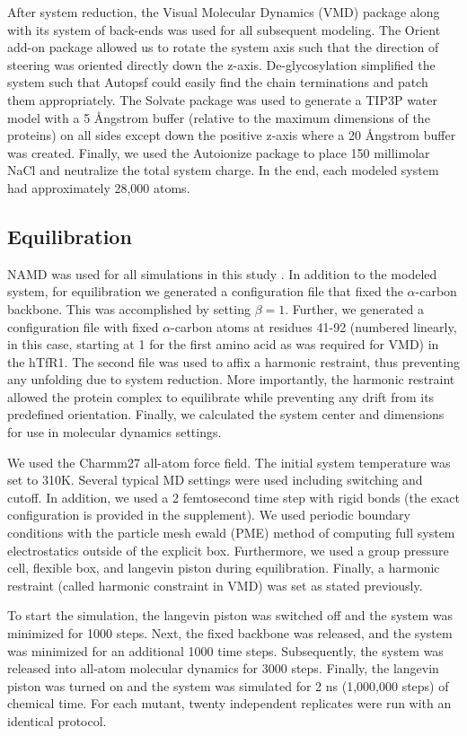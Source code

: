 \documentclass[12pt]{article}
\begin{document}
After system reduction, the Visual Molecular Dynamics (VMD) \citep{Humphrey1996} package along with its system of back-ends was used for all subsequent modeling. The Orient add-on package allowed us to rotate the system axis such that the direction of steering was oriented directly down the z-axis. De-glycosylation simplified the system such that Autopsf could easily find the chain terminations and patch them appropriately. The Solvate package was used to generate a TIP3P water model with a 5 \AA ngstrom buffer (relative to the maximum dimensions of the proteins) on all sides except down the positive z-axis where a 20 \AA ngstrom buffer was created. Finally, we used the Autoionize package to place 150 millimolar NaCl and neutralize the total system charge. In the end, each modeled system had approximately 28,000 atoms.

\subsection*{Equilibration}
NAMD was used for all simulations in this study \citep{Phillips2005}. In addition to the modeled system, for equilibration we generated a configuration file that fixed the $\alpha$-carbon backbone. This was accomplished by setting $\beta = 1$. Further, we generated a configuration file with fixed $\alpha$-carbon atoms at residues 41-92 (numbered linearly, in this case, starting at 1 for the first amino acid as was required for VMD) in the hTfR1. The second file was used to affix a harmonic restraint, thus preventing any unfolding due to system reduction. More importantly, the harmonic restraint allowed the protein complex to equilibrate while preventing any drift from its predefined orientation. Finally, we calculated the system center and dimensions for use in molecular dynamics settings.

We used the Charmm27 \citep{Brooks1983} all-atom force field. The initial system temperature was set to 310K. Several typical MD settings were used including switching and cutoff. In addition, we used a 2 femtosecond time step with rigid bonds (the exact configuration is provided in the supplement). We used periodic boundary conditions with the particle mesh ewald (PME) method of computing full system electrostatics outside of the explicit box. Furthermore, we used a group pressure cell, flexible box, and langevin piston during equilibration. Finally, a harmonic restraint (called harmonic constraint in VMD) was set as stated previously.

To start the simulation, the langevin piston was switched off and the system was minimized for 1000 steps. Next, the fixed backbone was released, and the system was minimized for an additional 1000 time steps. Subsequently, the system was released into all-atom molecular dynamics for 3000 steps. Finally, the langevin piston was turned on and the system was simulated for 2 ns (1,000,000 steps) of chemical time. For each mutant, twenty independent replicates were run with an identical protocol.
\end{document}
